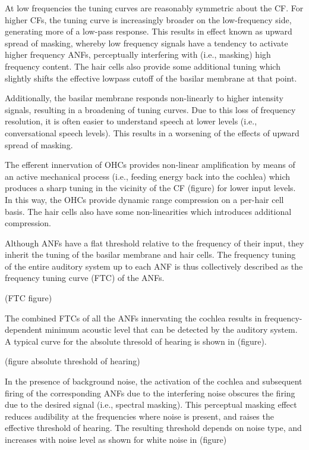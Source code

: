 At low frequencies the tuning curves are reasonably symmetric about the CF. For higher CFs, the tuning curve is increasingly broader on the low-frequency side, generating more of a low-pass response.  This results in effect known as upward spread of masking, whereby low frequency signals have a tendency to activate higher frequency ANFs, perceptually interfering with (i.e., masking) high frequency content. The hair cells also provide some additional tuning which slightly shifts the effective lowpass cutoff of the basilar membrane at that point.

Additionally, the basilar membrane responds non-linearly to higher intensity signals, resulting in a broadening of tuning curves. Due to this loss of frequency resolution, it is often easier to understand speech at lower levels (i.e., conversational speech levels). This results in a worsening of the effects of upward spread of masking.

The efferent innervation of OHCs provides non-linear amplification by means of an active mechanical process (i.e., feeding energy back into the cochlea) which produces a sharp tuning in the vicinity of the CF (figure) for lower input levels. In this way, the OHCs provide dynamic range compression on a per-hair cell basis. The hair cells also have some non-linearities which introduces additional compression.

Although ANFs have a flat threshold relative to the frequency of their input, they inherit the tuning of the basilar membrane and hair cells. The frequency tuning of the entire auditory system up to each ANF is thus collectively described as the frequency tuning curve (FTC) of the ANFs.

(FTC figure)

The combined FTCs of all the ANFs innervating the cochlea results in frequency-dependent minimum acoustic level that can be detected by the auditory system. A typical curve for the absolute thresold of hearing is shown in (figure).

(figure absolute threshold of hearing)

In the presence of background noise, the activation of the cochlea and subsequent firing of the corresponding ANFs due to the interfering noise obscures the firing due to the desired signal (i.e., spectral masking). This perceptual masking effect reduces audibility at the frequencies where noise is present, and raises the effective threshold of hearing. The resulting threshold depends on noise type, and increases with noise level as shown for white noise in (figure)

